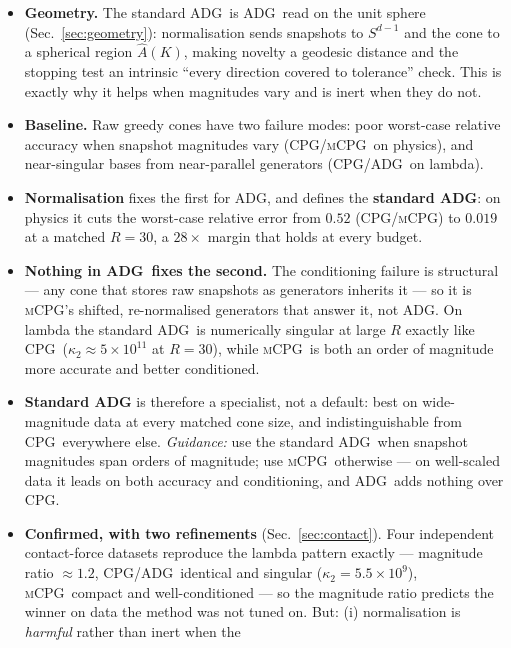 \documentclass[11pt]{article}
\newcommand{\CPG}{\textsc{CPG}}
\newcommand{\ADG}{\textsc{ADG}}
\newcommand{\mCPG}{\textsc{mCPG}}
\begin{document}
\begin{itemize}
  \item \textbf{Geometry.} The standard \ADG\ is \ADG\ read on the unit sphere
        (Sec.~\ref{sec:geometry}): normalisation sends snapshots to $S^{d-1}$ and
        the cone to a spherical region $\widehat A(K)$, making novelty a geodesic
        distance and the stopping test an intrinsic ``every direction covered to
        tolerance'' check. This is exactly why it helps when magnitudes vary and
        is inert when they do not.
  \item \textbf{Baseline.} Raw greedy cones have two failure modes: poor
        worst-case relative accuracy when snapshot magnitudes vary (\CPG/\mCPG\ on
        physics), and near-singular bases from near-parallel generators
        (\CPG/\ADG\ on lambda).
  \item \textbf{Normalisation} fixes the first for \ADG, and defines the
        \textbf{standard \ADG}: on physics it cuts the worst-case relative error
        from $0.52$ (\CPG/\mCPG) to $0.019$ at a matched $R=30$, a $28\times$
        margin that holds at every budget.
  \item \textbf{Nothing in \ADG\ fixes the second.} The conditioning failure is
        structural --- any cone that stores raw snapshots as generators inherits
        it --- so it is \mCPG's shifted, re-normalised generators that answer it,
        not \ADG. On lambda the standard \ADG\ is numerically singular at large
        $R$ exactly like \CPG\ ($\kappa_2\approx5\times10^{11}$ at $R=30$), while
        \mCPG\ is both an order of magnitude more accurate and better conditioned.
  \item \textbf{Standard \ADG} is therefore a specialist, not a default: best on
        wide-magnitude data at every matched cone size, and indistinguishable from
        \CPG\ everywhere else. \emph{Guidance:} use the standard \ADG\ when
        snapshot magnitudes span orders of magnitude; use \mCPG\ otherwise --- on
        well-scaled data it leads on both accuracy and conditioning, and \ADG\ adds
        nothing over \CPG.
  \item \textbf{Confirmed, with two refinements} (Sec.~\ref{sec:contact}). Four
        independent contact-force datasets reproduce the lambda pattern exactly
        --- magnitude ratio $\approx1.2$, \CPG/\ADG\ identical and singular
        ($\kappa_2=5.5\times10^{9}$), \mCPG\ compact and well-conditioned --- so
        the magnitude ratio predicts the winner on data the method was not tuned
        on. But: (i) normalisation is \emph{harmful} rather than inert when the

\end{itemize}
\end{document}
